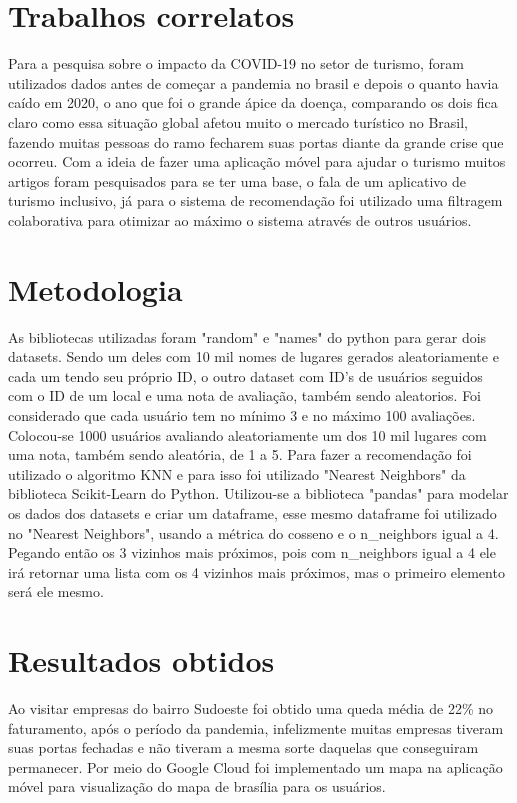\documentclass[conference]{IEEEtran}
\begin{document}
\section{Trabalhos correlatos}
Para a pesquisa sobre o impacto da COVID-19 no setor de turismo, foram utilizados dados antes de começar a pandemia no brasil\cite{b1} e depois o quanto havia caído em 2020\cite{b2}, o ano que foi o grande ápice da doença, comparando os dois fica claro como essa situação global afetou muito o mercado turístico no Brasil, fazendo muitas pessoas do ramo fecharem suas portas diante da grande crise que ocorreu. Com a ideia de fazer uma aplicação móvel para ajudar o turismo muitos artigos foram pesquisados para se ter uma base, o \cite{b3} fala de um aplicativo de turismo inclusivo, já para o sistema de recomendação foi utilizado uma filtragem colaborativa \cite{b4} para otimizar ao máximo o sistema através de outros usuários.

\section{Metodologia}
As bibliotecas utilizadas foram "random" e "names" do python para gerar dois datasets. Sendo um deles com 10 mil nomes de lugares gerados aleatoriamente e cada um tendo seu próprio ID, o outro dataset com ID's de usuários seguidos com o ID de um local e uma nota de avaliação, também sendo aleatorios. Foi considerado que cada usuário tem no mínimo 3 e no máximo 100 avaliações. Colocou-se 1000 usuários avaliando aleatoriamente um dos 10 mil lugares com uma nota, também sendo aleatória, de 1 a 5. Para fazer a recomendação foi utilizado o algoritmo KNN e para isso foi utilizado "Nearest Neighbors" da biblioteca Scikit-Learn do Python. Utilizou-se a biblioteca "pandas" para modelar os dados dos datasets e criar um dataframe, esse mesmo dataframe foi utilizado no "Nearest Neighbors", usando a métrica do cosseno e o n\_neighbors igual a 4. Pegando então os 3 vizinhos mais próximos, pois com n\_neighbors igual a 4 ele irá retornar uma lista com os 4 vizinhos mais próximos, mas o primeiro elemento será ele mesmo.

\section{Resultados obtidos}
Ao visitar empresas do bairro Sudoeste foi obtido uma queda média de 22\% no faturamento, após o período da pandemia, infelizmente muitas empresas tiveram suas portas fechadas e não tiveram a mesma sorte daquelas que conseguiram permanecer. Por meio do Google Cloud foi implementado um mapa na aplicação móvel para visualização do mapa de brasília para os usuários.
\end{document}
